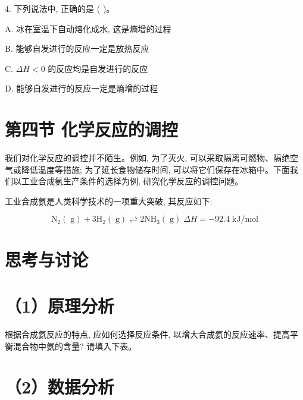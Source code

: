 \documentclass[10pt]{article}
\begin{document}
4. 下列说法中, 正确的是 ( )。

A. 冰在室温下自动熔化成水, 这是熵增的过程

B. 能够自发进行的反应一定是放热反应

C. \({\Delta H} < 0\) 的反应均是自发进行的反应

D. 能够自发进行的反应一定是熵增的过程

\section*{第四节 化学反应的调控}

我们对化学反应的调控并不陌生。例如, 为了灭火, 可以采取隔离可燃物、隔绝空气或降低温度等措施; 为了延长食物储存时间, 可以将它们保存在冰箱中。下面我们以工业合成氨生产条件的选择为例, 研究化学反应的调控问题。

工业合成氨是人类科学技术的一项重大突破, 其反应如下:

\[
{\mathrm{N}}_{2}\left( \mathrm{\;g}\right) + 3{\mathrm{H}}_{2}\left( \mathrm{\;g}\right) \rightleftharpoons 2{\mathrm{{NH}}}_{3}\left( \mathrm{\;g}\right) \;{\Delta H} = - {92.4}\mathrm{\;{kJ}}/\mathrm{{mol}}
\]

\section*{思考与讨论}

\section*{（1）原理分析}

根据合成氨反应的特点, 应如何选择反应条件, 以增大合成氨的反应速率、提高平衡混合物中氨的含量? 请填入下表。

\begin{center}
\end{center}

\section*{（2）数据分析}
\end{document}
